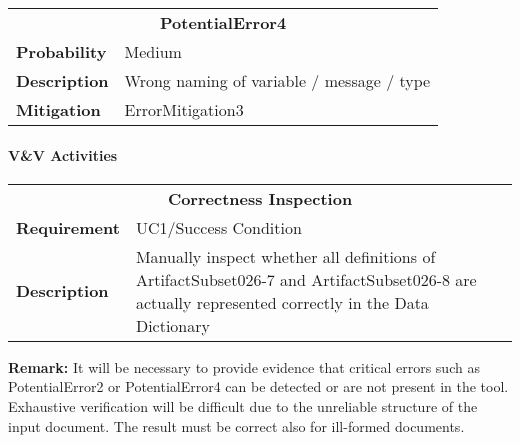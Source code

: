 \begin{tabular}{|lp{}|}
\hline
\multicolumn{2}{|c|}{\bf PotentialError4}\\
\bf Probability&Medium\\
\bf Description&Wrong naming of variable / message / type\\
\bf Mitigation&ErrorMitigation3\\
\hline
\end{tabular}

\paragraph{V\&V Activities}

\begin{tabular}{|lp{}|}
\hline
\multicolumn{2}{|c|}{\bf Correctness Inspection}\\
\bf Requirement&UC1/Success Condition\\
\bf Description&Manually inspect whether all definitions of ArtifactSubset026-7 and ArtifactSubset026-8 are actually represented correctly in the Data Dictionary\\
\hline
\end{tabular}



\textbf{Remark: } It will be necessary to provide evidence that critical errors such as PotentialError2 or PotentialError4 can be detected or are not present in the tool. 
                   Exhaustive verification will be difficult due to the unreliable structure of the input document. The result must be correct
                   also for ill-formed documents.


